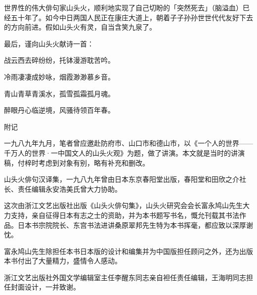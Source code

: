 {    世界性的伟大俳句家山头火，顺利地实现了自己切盼的「突然死去」（脑溢血）巳经五十年了。如今中日两国人民正在康庄大道上，朝着子子孙孙世世代代友好下去的方向前进。假如山头火有灵，自当含笑九泉了。

    最后，谨向山头火献诗一首：
    \begin{center}
        战云西去碎纷纷，托钵漫游耽苦吟。

        冷雨凄凄成妙咏，烟霞渺渺慕乡音。

        青山青草青溪水，孤雪孤霜孤月魂。

        醉眼丹心临逆境，风骚待领百年春。
    \end{center}

    {\Large 附记}

    一九八九年九月，笔者曾应邀赴防府市、山口市和德山市，以《一个人的世界——千万人的世界·一中国文人的山头火观》为题，做了讲演。本文就是当时的讲演稿，付梓时考虑到对象有别，略有补充和删改。

    山头火俳句汉译集，一九八九年曾由日本东京春阳堂出版，春阳堂和田欣之介社长、责任编辑永安浩美氏曾大力协助。

    这次由浙江文艺出版社出版《山头火俳句集》，山头火研究会会长富永鸠山先生大力支持，亲自征得日本有志之士的资助，并为本书题写书名，慨允刊载其书法作品。日本书宗院院长、东宫书法进讲桑原翠邦先生特为本书挥毫，都应致以深厚谢忱。

    富永鸠山先生除担任本书日本版的设计和编集并为中国版担任顾问之外，还为出版本书付出了大量精力，盛情令人感动。

    浙江文艺出版社外国文学编辑室主任李醒东同志亲自袒任责任编辑，王海明同志担任封面设计，一并致谢。
}
